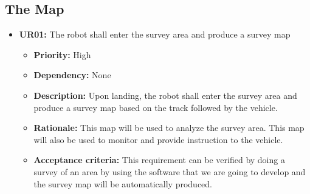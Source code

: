\documentclass[10pt,a4paper,titlepage]{article}
\begin{document}
	\subsection{The Map}
    \begin{itemize}
		\item \textbf{UR01:} The robot shall enter the survey area and produce a survey map
		\begin{itemize}
			\item \textbf{Priority:} High
            \item \textbf{Dependency:} None
			\item \textbf{Description:} Upon landing, the robot shall enter the survey area and produce a survey map based on the track followed by the vehicle. 
            \item \textbf{Rationale:} This map will be used to analyze the survey area. This map will also be used to monitor and provide instruction to the vehicle.  
            \item \textbf{Acceptance criteria:} This requirement can be verified by doing a survey of an area  by using the software that we are going to develop and the survey map will be automatically produced. 
		\end{itemize} 
	\end{itemize}
    
\end{document}
